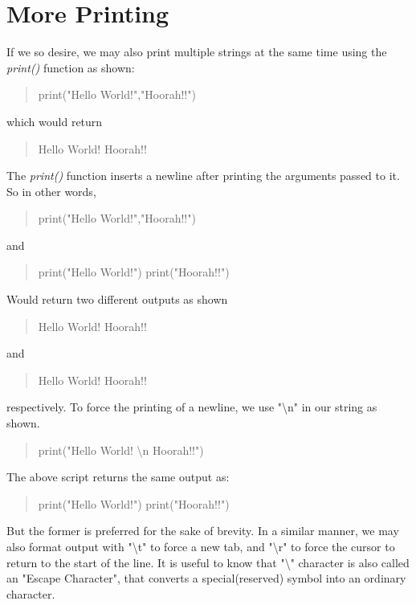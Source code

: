 \section{More Printing}
If we so desire, we may also print multiple strings at the same time using the \emph{print()} function as shown:
\begin{quote}
print("Hello World!","Hoorah!!")
\end{quote}
which would return
\begin{quote}
Hello World! Hoorah!!
\end{quote}
The \emph{print()} function inserts a newline after printing the arguments passed to it. So in other words,
\begin{quote}
print("Hello World!","Hoorah!!")
\end{quote}
and 
\begin{quote}
print("Hello World!")\newline 
print("Hoorah!!")
\end{quote}
Would return two different outputs as shown
\begin{quote}
Hello World! Hoorah!!
\end{quote}
and 
\begin{quote}
Hello World!\newline 
Hoorah!!
\end{quote}
respectively.\newline 
To force the printing of a newline, we use "\textbackslash n" in our string as shown.
\begin{quote}
print("Hello World! \textbackslash n Hoorah!!")
\end{quote}
The above script returns the same output as:
\begin{quote}
print("Hello World!")\newline 
print("Hoorah!!")
\end{quote}
But the former is preferred for the sake of brevity.\newline 
In a similar manner, we may also format output with "\textbackslash t" to force a new tab, and "\textbackslash r" to force the cursor to return to the start of the line.\newline 
It is useful to know that "\textbackslash" character is also called an "Escape Character", that converts a special(reserved) symbol into an ordinary character.
